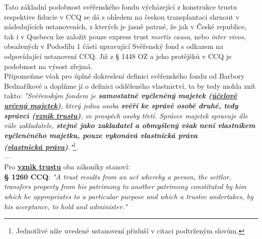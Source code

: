 \documentclass{article}
\begin{document}




Tato základní podobnost svěřenského fondu výcházející z konstrukce trustu respektive fiducie v CCQ se dá s ohledem na českou transplantaci shrnout v následujících ustanoveních, z kterých je jasně patrné, že jak v České republice, tak i v Quebecu lze založit pouze express trust \textit{mortis causa}, nebo \textit{inter vivos}, obsažených v Pododílu 1 části upravující Svěřenský fond s odkazem na odpovídající ustanovení CCQ. Již z § 1448 OZ a jeho protějšků v CCQ je podobnost na výsost zřejmá.\\

Připomeňme však pro úplné dokreslení definici svěřenského fondu od Barbory Bednaříkové a doplňme jí o definici odděleného vlastnictví, ta by tedy mohla znít takto: \textit{"Svěřenským fondem je \textbf{samostatně vyčleněný majetek (\underline{účelově určený majetek})}, který jedna osoba \textbf{svěří ke správě osobě druhé, tedy správci (\underline{vznik trustu})}, ve prospěch osoby třetí. Správce majetek spravuje dle vůle zakladatele, \textbf{stejně jako zakladatel a obmyšlený však není vlastníkem vyčleněného majetku, pouze vykonává vlastnická práva\\ (\underline{vlastnická práva})}."}\footnote{Jednotlivé níže uvedené ustanovení přisluší v citaci podtrženým slovům.}.\\



---\\

Pro \textbf{\underline{vznik trustu}} oba zákoníky stanoví:\\

\textbf{§ 1260 CCQ}: \textit{"A trust results from an act whereby a person, the settlor, transfers property from his patrimony to another patrimony constituted by him which he appropriates to a particular purpose and which a trustee undertakes, by his acceptance, to hold and administer."}\\
\end{document}
